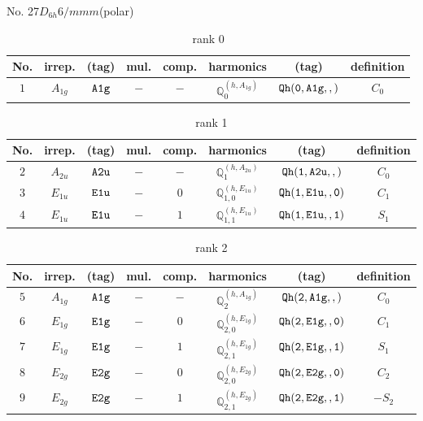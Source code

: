 \documentclass[fleqn,8pt]{jsarticle}
\begin{document}
\setcounter{MaxMatrixCols}{16}

\begin{center}
\LARGE
No. 27\quad$D_{6h}$\quad$6/mmm$\quad[ hexagonal ] (polar)
\end{center}
\begin{table}[ht!]
\begin{center}
\caption{rank 0}
\renewcommand{\arraystretch}{1.3}
\begin{tabular}{cccccccc} \hline \hline
No. & irrep. & (tag) & mul. & comp. & harmonics & (tag) & definition \\ \hline
$ 1 $ & $ A_{1g} $ & $ {\tt A1g} $ & $ - $ & $ - $ & $ \mathbb{Q}_{0}^{(h,A_{1g})} $ & $ {\tt Qh(0,A1g,,)} $ & $ C_{0} $ \\
 \hline \hline
\end{tabular}
\end{center}
\end{table}
\begin{table}[ht!]
\begin{center}
\caption{rank 1}
\renewcommand{\arraystretch}{1.3}
\begin{tabular}{cccccccc} \hline \hline
No. & irrep. & (tag) & mul. & comp. & harmonics & (tag) & definition \\ \hline
$ 2 $ & $ A_{2u} $ & $ {\tt A2u} $ & $ - $ & $ - $ & $ \mathbb{Q}_{1}^{(h,A_{2u})} $ & $ {\tt Qh(1,A2u,,)} $ & $ C_{0} $ \\
$ 3 $ & $ E_{1u} $ & $ {\tt E1u} $ & $ - $ & $ 0 $ & $ \mathbb{Q}_{1,0}^{(h,E_{1u})} $ & $ {\tt Qh(1,E1u,,0)} $ & $ C_{1} $ \\
$ 4 $ & $ E_{1u} $ & $ {\tt E1u} $ & $ - $ & $ 1 $ & $ \mathbb{Q}_{1,1}^{(h,E_{1u})} $ & $ {\tt Qh(1,E1u,,1)} $ & $ S_{1} $ \\
 \hline \hline
\end{tabular}
\end{center}
\end{table}
\begin{table}[ht!]
\begin{center}
\caption{rank 2}
\renewcommand{\arraystretch}{1.3}
\begin{tabular}{cccccccc} \hline \hline
No. & irrep. & (tag) & mul. & comp. & harmonics & (tag) & definition \\ \hline
$ 5 $ & $ A_{1g} $ & $ {\tt A1g} $ & $ - $ & $ - $ & $ \mathbb{Q}_{2}^{(h,A_{1g})} $ & $ {\tt Qh(2,A1g,,)} $ & $ C_{0} $ \\
$ 6 $ & $ E_{1g} $ & $ {\tt E1g} $ & $ - $ & $ 0 $ & $ \mathbb{Q}_{2,0}^{(h,E_{1g})} $ & $ {\tt Qh(2,E1g,,0)} $ & $ C_{1} $ \\
$ 7 $ & $ E_{1g} $ & $ {\tt E1g} $ & $ - $ & $ 1 $ & $ \mathbb{Q}_{2,1}^{(h,E_{1g})} $ & $ {\tt Qh(2,E1g,,1)} $ & $ S_{1} $ \\
$ 8 $ & $ E_{2g} $ & $ {\tt E2g} $ & $ - $ & $ 0 $ & $ \mathbb{Q}_{2,0}^{(h,E_{2g})} $ & $ {\tt Qh(2,E2g,,0)} $ & $ C_{2} $ \\
$ 9 $ & $ E_{2g} $ & $ {\tt E2g} $ & $ - $ & $ 1 $ & $ \mathbb{Q}_{2,1}^{(h,E_{2g})} $ & $ {\tt Qh(2,E2g,,1)} $ & $ - S_{2} $ \\
 \hline \hline
\end{tabular}
\end{center}
\end{table}
\end{document}
